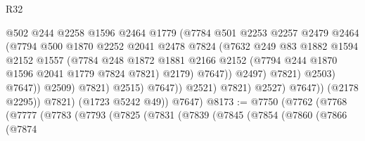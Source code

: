 \begin{lexlean}{R32}
\begin{coremodule}
                                        @502
                                        @244
                                        @2258
                                        @1596
                                        @2464
                                        @1779
                                        (@7784
                                          @501
                                          @2253
                                          @2257
                                          @2479
                                          @2464
                                          (@7794
                                            @500
                                            @1870
                                            @2252
                                            @2041
                                            @2478
                                            @7824
                                            (@7632
                                              @249
                                              @83
                                              @1882
                                              @1594
                                              @2152
                                              @1557
                                              (@7784
                                                @248
                                                @1872
                                                @1881
                                                @2166
                                                @2152
                                                (@7794 @244 @1870 @1596 @2041 @1779 @7824 @7821)
                                                @2179)
                                              @7647))
                                          @2497)
                                        @7821)
                                      @2503)
                                    @7647))
                                @2509)
                              @7821)
                            @2515)
                          @7647))
                      @2521)
                    @7821)
                  @2527)
                @7647))
            (@2178 @2295))
          @7821)
        (@1723 @5242 @49))
      @7647)
@8173 := @7750
    (@7762
      (@7768
        (@7777
          (@7783
            (@7793
              (@7825
                (@7831
                  (@7839
                    (@7845
                      (@7854
                        (@7860
                          (@7866
                            (@7874

\end{coremodule}
\end{lexlean}
